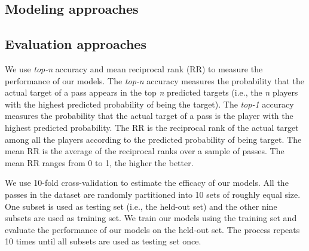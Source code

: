 \subsection{Modeling approaches}



\subsection{Evaluation approaches}

We use \textit{top-n} accuracy and mean reciprocal rank (RR) to measure the performance of our models.
The \textit{top-n} accuracy measures the probability that the actual target of a pass appears in the top \textit{n} predicted targets (i.e., the \textit{n} players with the highest predicted probability of being the target).
The \textit{top-1} accuracy measures the probability that the actual target of a pass is the player with the highest predicted probability.
The RR is the reciprocal rank of the actual target among all the players according to the predicted probability of being target.
The mean RR is the average of the reciprocal ranks over a sample of passes. The mean RR ranges from 0 to 1, the higher the better.
 
We use 10-fold cross-validation to estimate the efficacy of our models. All the passes in the dataset are randomly partitioned into 10 sets of roughly equal size. One subset is used as testing set (i.e., the held-out set) and the other nine subsets are used as training set. 
We train our models using the training set and evaluate the performance of our models on the held-out set.
The process repeats 10 times until all subsets are used as testing set once.
